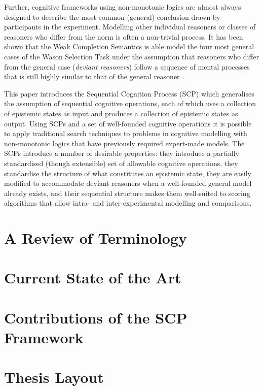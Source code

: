 \documentclass[
11pt, %
english, %
singlespacing, %
headsepline, %
]{MastersDoctoralThesis} %
\begin{document}
Further, cognitive frameworks using non-monotonic logics are almost always designed to describe the most common (general) conclusion drawn by participants in the experiment. Modelling other individual reasoners or classes of reasoners who differ from the norm is often a non-trivial process. It has been shown that the Weak Completion Semantics \citep{holldobler2015weak} is able model the four most general cases of the Wason Selection Task under the assumption that reasoners who differ from the general case (\textit{deviant reasoners}) follow a sequence of mental processes that is still highly similar to that of the general reasoner \citep{breu2019weak}.

This paper introduces the Sequential Cognition Process (SCP) which generalises the assumption of sequential cognitive operations, each of which uses a collection of epistemic states as input and produces a collection of epistemic states as output. Using SCPs and a set of well-founded cognitive operations it is possible to apply traditional search techniques to problems in cognitive modelling with non-monotonic logics that have previously required expert-made models. The SCPs introduce a number of desirable properties: they introduce a partially standardised (though extensible) set of allowable cognitive operations, they standardise the structure of what constitutes an epistemic state, they are easily modified to accommodate deviant reasoners when a well-founded general model already exists, and their sequential structure makes them well-suited to scoring algorithms that allow intra- and inter-experimental modelling and comparisons.


\section{A Review of Terminology} \label{sec:terminology}
\section{Current State of the Art} \label{sec:soa}
\section{Contributions of the SCP Framework} \label{sec:contributions}
\section{Thesis Layout} \label{sec:layout}
\end{document}
